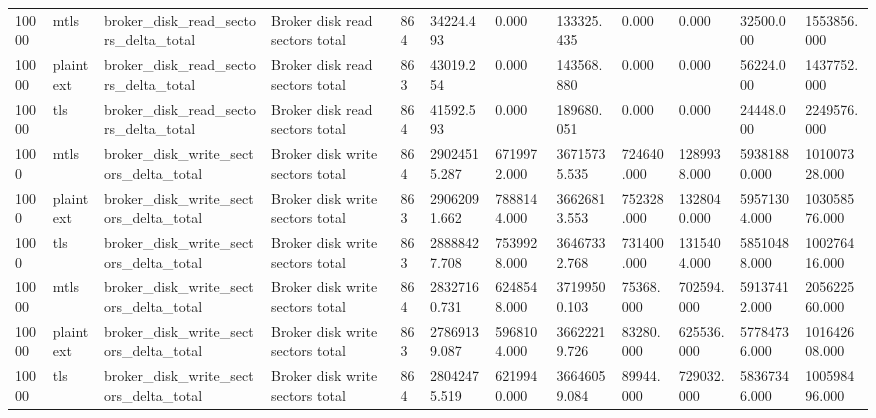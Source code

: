\begin{longtable}{llllllllllll}
10000 & mtls & broker\_disk\_read\_sectors\_delta\_total & Broker disk read sectors total & 864 & 34224.493 & 0.000 & 133325.435 & 0.000 & 0.000 & 32500.000 & 1553856.000 \\
10000 & plaintext & broker\_disk\_read\_sectors\_delta\_total & Broker disk read sectors total & 863 & 43019.254 & 0.000 & 143568.880 & 0.000 & 0.000 & 56224.000 & 1437752.000 \\
10000 & tls & broker\_disk\_read\_sectors\_delta\_total & Broker disk read sectors total & 864 & 41592.593 & 0.000 & 189680.051 & 0.000 & 0.000 & 24448.000 & 2249576.000 \\
1000 & mtls & broker\_disk\_write\_sectors\_delta\_total & Broker disk write sectors total & 864 & 29024515.287 & 6719972.000 & 36715735.535 & 724640.000 & 1289938.000 & 59381880.000 & 101007328.000 \\
1000 & plaintext & broker\_disk\_write\_sectors\_delta\_total & Broker disk write sectors total & 863 & 29062091.662 & 7888144.000 & 36626813.553 & 752328.000 & 1328040.000 & 59571304.000 & 103058576.000 \\
1000 & tls & broker\_disk\_write\_sectors\_delta\_total & Broker disk write sectors total & 863 & 28888427.708 & 7539928.000 & 36467332.768 & 731400.000 & 1315404.000 & 58510488.000 & 100276416.000 \\
10000 & mtls & broker\_disk\_write\_sectors\_delta\_total & Broker disk write sectors total & 864 & 28327160.731 & 6248548.000 & 37199500.103 & 75368.000 & 702594.000 & 59137412.000 & 205622560.000 \\
10000 & plaintext & broker\_disk\_write\_sectors\_delta\_total & Broker disk write sectors total & 863 & 27869139.087 & 5968104.000 & 36622219.726 & 83280.000 & 625536.000 & 57784736.000 & 101642608.000 \\
10000 & tls & broker\_disk\_write\_sectors\_delta\_total & Broker disk write sectors total & 864 & 28042475.519 & 6219940.000 & 36646059.084 & 89944.000 & 729032.000 & 58367346.000 & 100598496.000 \\
\hline
\end{longtable}
